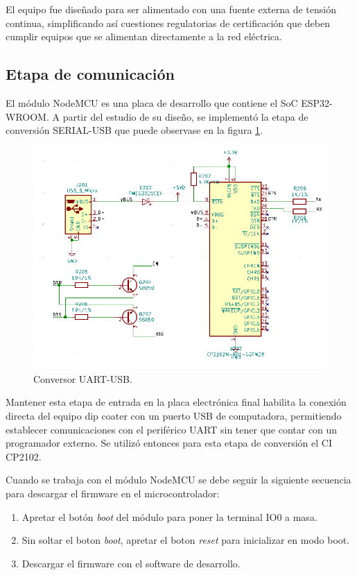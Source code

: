 El equipo fue diseñado para ser alimentado con una fuente externa de tensión continua, simplificando así cuestiones regulatorias de certificación que deben cumplir equipos que se alimentan directamente a la red eléctrica.




\subsection{Etapa de comunicación}

El módulo NodeMCU es una placa de desarrollo que contiene el SoC ESP32-WROOM. A partir del estudio de su diseño, se implementó la etapa de conversión SERIAL-USB que puede observase en la figura \ref{fig:kicad_conversor}. 


\begin{figure}[!h]
	\centering
	\includegraphics[width=1\textwidth]{./Figures/kicad_conversor.png}
	\caption{Conversor UART-USB.}
	\label{fig:kicad_conversor}
\end{figure}

Mantener esta etapa de entrada en la placa electrónica final habilita la conexión directa del equipo dip coater con un puerto USB de computadora, permitiendo establecer comunicaciones con el periférico UART sin tener que contar con un programador externo. Se utilizó entonces para esta etapa de conversión el CI CP2102.

Cuando se trabaja con el módulo NodeMCU se debe seguir la siguiente secuencia para descargar el firmware en el microcontrolador:
\begin{enumerate}
\item Apretar el botón \textit{boot} del módulo para poner la terminal IO0 a masa.
\item Sin soltar el boton \textit{boot}, apretar el boton \textit{reset} para inicializar en modo boot.
\item Descargar el firmware con el software de desarrollo. 
\end{enumerate}

